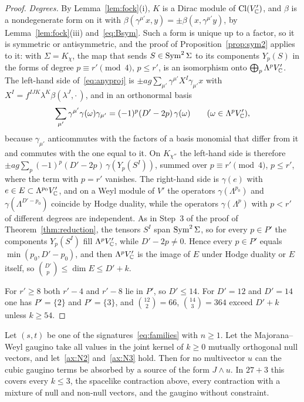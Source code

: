 \begin{proof}
\emph{Degrees.} By Lemma~\ref{lem:fock}(i), $K$ is a Dirac module of $\operatorname{Cl}(V'_{\mathbb{C}})$, and $\beta$ is a nondegenerate form on it with $\beta(\gamma^{\mu'}x,y)=\pm\beta(x,\gamma^{\mu'}y)$, by Lemma~\ref{lem:fock}(iii) and~\eqref{eq:Bsym}. Such a form is unique up to a factor, so it is symmetric or antisymmetric, and the proof of Proposition~\ref{prop:sym2} applies to it: with $\Sigma=K_\chi$, the map that sends $S\in\operatorname{Sym}^2\Sigma$ to its components $Y_p(S)$ in the forms of degree $p\equiv r'\pmod4$, $p\le r'$, is an isomorphism onto $\bigoplus_p\Lambda^pV'_{\mathbb{C}}$. The left-hand side of~\eqref{eq:anyproj} is $\pm ag\sum_{\mu'}\gamma^{\mu'}X^I\gamma_{\mu'}x$ with $X^I=f^{IJK}\lambda^K\beta(\lambda^J,\cdot\,)$, and in an orthonormal basis
\[
 \sum_{\mu'}\gamma^{\mu'}\gamma(\omega)\gamma_{\mu'}=(-1)^p(D'-2p)\,\gamma(\omega)\qquad(\omega\in\Lambda^pV'_{\mathbb{C}}),
\]
because $\gamma_{\mu'}$ anticommutes with the factors of a basis monomial that differ from it and commutes with the one equal to it. On $K_{\chi''}$ the left-hand side is therefore $\pm ag\sum_p(-1)^p(D'-2p)\,\gamma(Y_p(S^I))$, summed over $p\equiv r'\pmod4$, $p\le r'$, where the term with $p=r'$ vanishes. The right-hand side is $\gamma(e)$ with $e\in E\subset\Lambda^{p_0}V'_{\mathbb{C}}$, and on a Weyl module of $V'$ the operators $\gamma(\Lambda^{p_0})$ and $\gamma(\Lambda^{D'-p_0})$ coincide by Hodge duality, while the operators $\gamma(\Lambda^p)$ with $p<r'$ of different degrees are independent. As in Step~3 of the proof of Theorem~\ref{thm:reduction}, the tensors $S^I$ span $\operatorname{Sym}^2\Sigma$, so for every $p\in P'$ the components $Y_p(S^I)$ fill $\Lambda^pV'_{\mathbb{C}}$, while $D'-2p\ne0$. Hence every $p\in P'$ equals $\min(p_0,D'-p_0)$, and then $\Lambda^pV'_{\mathbb{C}}$ is the image of $E$ under Hodge duality or $E$ itself, so $\binom{D'}{p}\le\dim E\le D'+k$.

For $r'\ge8$ both $r'-4$ and $r'-8$ lie in $P'$, so $D'\le14$. For $D'=12$ and $D'=14$ one has $P'=\{2\}$ and $P'=\{3\}$, and $\binom{12}{2}=66$, $\binom{14}{3}=364$ exceed $D'+k$ unless $k\ge54$.
\end{proof}

\begin{corollary}
\label{cor:anysource}
Let $(s,t)$ be one of the signatures~\eqref{eq:families} with $n\ge1$. Let the Majorana--Weyl gaugino take all values in the joint kernel of $k\ge0$ mutually orthogonal null vectors, and let~\ref{ax:N2} and~\ref{ax:N3} hold. Then for no multivector $u$ can the cubic gaugino terms be absorbed by a source of the form $J\wedge u$. In $27+3$ this covers every $k\le3$, the spacelike contraction above, every contraction with a mixture of null and non-null vectors, and the gaugino without constraint.
\end{corollary}

